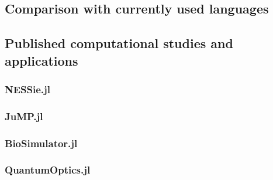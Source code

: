\subsection{Comparison with currently used languages}
\subsection{Published computational studies and applications}
\subsubsection{NESSie.jl}
\subsubsection{JuMP.jl}
\subsubsection{BioSimulator.jl}
\subsubsection{QuantumOptics.jl}
